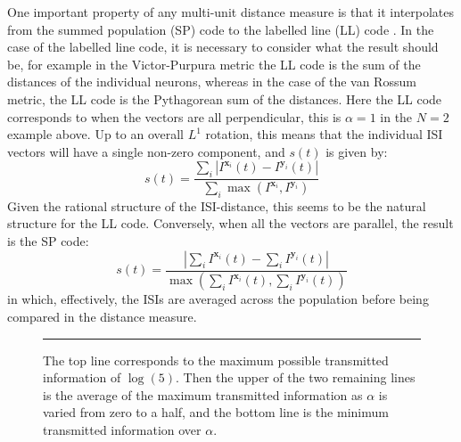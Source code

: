 One important property of any multi-unit distance measure is that it interpolates from the summed population (SP) code  to the labelled line (LL) code .  In the case of the labelled line code, it is necessary to consider what the result should be, for example in the Victor-Purpura metric the LL code is the sum of the distances of the individual neurons, whereas in the case of the van Rossum metric, the LL code is the Pythagorean sum of the distances.  Here the LL code corresponds to when the vectors are all perpendicular,   this is $\alpha=1$ in the $N=2$ example above.  Up to an overall $L^1$ rotation, this means that the individual ISI vectors will have a single non-zero component, and $s(t)$ is given by:
\begin{equation}
s(t) = \frac{\sum_i | I^{\mathbf{x}_i} (t)  - I^{\mathbf{y}_i}(t)|}{\sum_i \max (I^{\mathbf{x}_i},I^{\mathbf{y}_i})}
 \end{equation}
 Given the rational structure of the ISI-distance, this seems to be the natural structure for the LL code.  
Conversely, when all the vectors are parallel, the result is the SP code:
\begin{equation}
s(t) = \frac{| \sum_i I^{\mathbf{x}_i}(t) - \sum_i I^{\mathbf{y}_i}(t) |}{\max (\sum_i I^{\mathbf{x}_i}(t),\sum_i I^{\mathbf{y}_i}(t) )}
\end{equation}
in which, effectively, the ISIs are averaged across the population before being compared in the distance measure.
%
%
\begin{figure}[htb]

\bigskip
\rule{33em}{0.5pt}
\caption{\label{mmav}The top line corresponds to the maximum possible transmitted information of $\log(5)$.  Then the upper of the two remaining lines is the average of the maximum transmitted information as $\alpha$ is varied from zero to a half, and the bottom line is the minimum transmitted information over $\alpha$.}
\end{figure}

